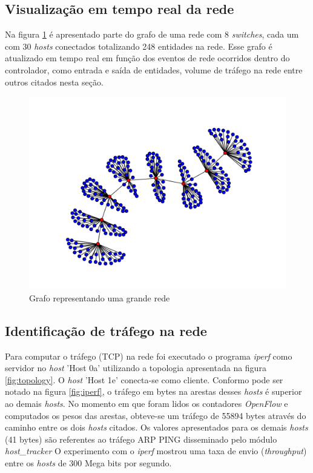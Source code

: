 \subsection{Visualização em tempo real da rede}
Na figura \ref{fig:full_graph} é apresentado parte do grafo de uma rede
com 8 \emph{switches}, cada um com 30 \emph{hosts} conectados totalizando
248 entidades na rede.
Esse grafo é atualizado em tempo real em função dos eventos de rede ocorridos 
dentro do controlador, como entrada e saída de entidades, volume de tráfego 
na rede entre outros citados nesta seção. 

\begin{figure}[h!]
    \centering
    \includegraphics[scale=0.5]{full_graph.png}
    \caption{Grafo representando uma grande rede}
    \label{fig:full_graph}
\end{figure}

\subsection{Identificação de tráfego na rede}
Para computar o tráfego (TCP) na rede foi executado o programa \emph{iperf} 
como servidor no \emph{host} 'Host 0a' utilizando a topologia apresentada
na figura \ref{fig:topology}.
O \emph{host} 'Host 1e' conecta-se como cliente. 
Conformo pode ser notado na figura \ref{fig:iperf}, o tráfego 
em bytes na arestas desses \emph{hosts} é superior ao demais \emph{hosts}.
No momento em que foram lidos os contadores \emph{OpenFlow} e computados
os pesos das arestas, obteve-se um tráfego de 55894 bytes através do caminho
entre os dois \emph{hosts} citados.
Os valores apresentados para os demais \emph{hosts} (41 bytes) são referentes
ao tráfego ARP PING disseminado pelo módulo \emph{host\_tracker}
O experimento com o \emph{iperf} mostrou uma taxa de envio 
(\emph{throughput}) entre os \emph{hosts} de 300 Mega bits por segundo.

